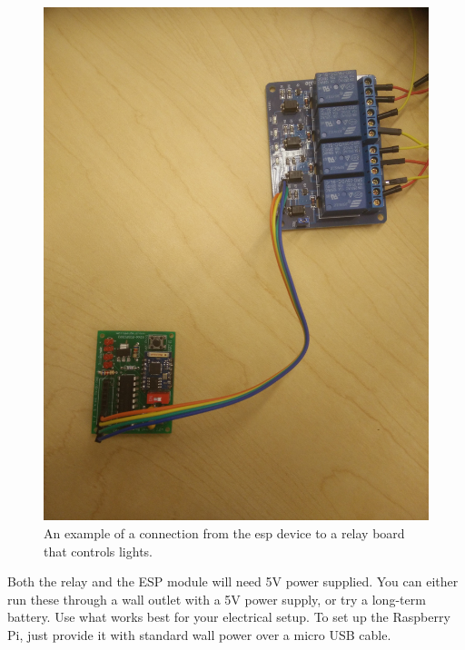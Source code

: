 \begin{figure}[h!]
   \includegraphics[scale=0.05]{connection}
   \caption{An example of a connection from the esp device to a relay board that controls lights.}
\end{figure}
Both the relay and the ESP module will need 5V power supplied. You can either run these through a wall outlet with a 5V power supply, or try a long-term battery. Use what works best for your electrical setup. To set up the Raspberry Pi, just provide it with standard wall power over a micro USB cable.
